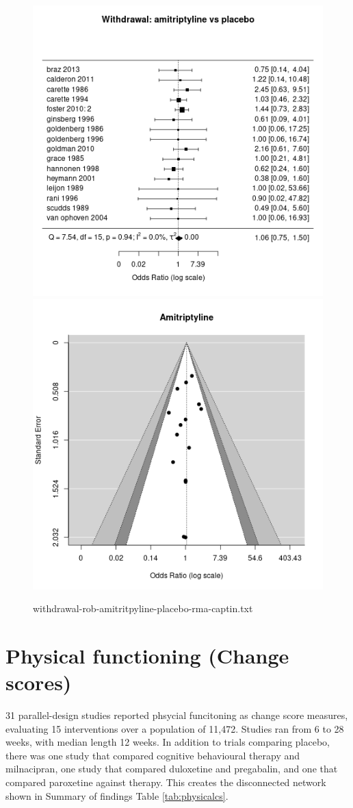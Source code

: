 \documentclass{report}\usepackage[]{graphicx}\usepackage[]{color}
\newenvironment{knitrout}{}{} %
\begin{document}
\begin{figure}

\begin{knitrout}
\color{fgcolor}
\includegraphics[width=0.5\linewidth,height=0.35\textheight]{img/withdrawal-amitriptyline-placebo-forest} 
\includegraphics[width=0.5\linewidth,height=0.35\textheight]{img/withdrawal-amitriptyline-placebo-funnel} 
\end{knitrout}

\caption[Withdrawal: amitritpyline vs placebo]{withdrawal-rob-amitritpyline-placebo-rma-captin.txt}
\label{fig:with-amitr-plac}
\end{figure}

\section{Physical functioning (Change scores)}

31 parallel-design studies reported phsycial funcitoning as change score measures, evaluating 15 interventions over a population of 11,472. Studies ran from 6 to 28 weeks, with median length 12 weeks. In addition to trials comparing placebo, there was one study that compared cognitive behavioural therapy and milnacipran, one study that compared duloxetine and pregabalin, and one that compared paroxetine against therapy. This creates the disconnected network shown in Summary of findings Table \ref{tab:physicalcs}.
\end{document}
